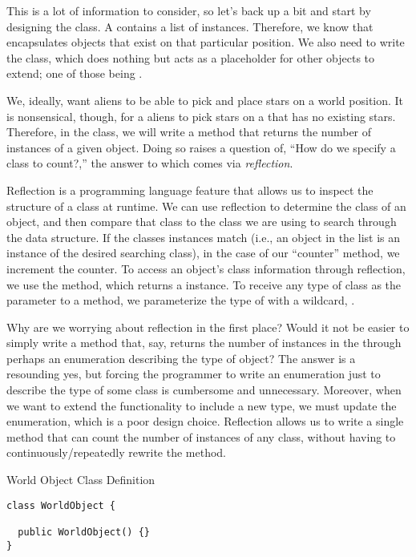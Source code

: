This is a lot of information to consider, so let's back up a bit and start by designing the  class. A  contains a list of  instances. Therefore, we know that  encapsulates objects that exist on that particular position. We also need to write the  class, which does nothing but acts as a placeholder for other objects to extend; one of those being .

We, ideally, want aliens to be able to pick and place stars on a world position. It is nonsensical, though, for a aliens to pick stars on a  that has no existing stars. Therefore, in the  class, we will write a method that returns the number of instances of a given object. Doing so raises a question of, ``How do we specify a class to count?,'' the answer to which comes via \textit{reflection}. 

Reflection is a programming language feature that allows us to inspect the structure of a class at runtime. We can use reflection to determine the class of an object, and then compare that class to the class we are using to search through the data structure. If the classes instances match (i.e., an object in the list is an instance of the desired searching class), in the case of our ``counter'' method, we increment the counter. To access an object's class information through reflection, we use the  method, which returns a  instance. To receive any type of class as the parameter to a method, we parameterize the type of  with a wildcard, .

Why are we worrying about reflection in the first place? Would it not be easier to simply write a method that, say, returns the number of  instances in the  through perhaps an enumeration describing the type of object? The answer is a resounding yes, but forcing the programmer to write an enumeration just to describe the type of some class is cumbersome and unnecessary. Moreover, when we want to extend the functionality to include a new type, we must update the enumeration, which is a poor design choice. Reflection allows us to write a single method that can count the number of instances of any class, without having to continuously/repeatedly rewrite the method.

\begin{cl}{World Object Class Definition}
\begin{lstlisting}[language=MyJava]
class WorldObject {

  public WorldObject() {}
}
\end{lstlisting}
\end{cl}

